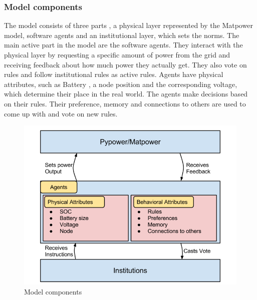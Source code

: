 \documentclass[a4paper]{article}
\begin{document}
\subsubsection{Model components}
The model consists of three parts , a physical layer represented by the Matpower model, software agents and an institutional 
layer, which sets the norms. 
The main active part in the model are the software agents. They interact with the physical layer by requesting a 
specific amount of power from the grid and receiving feedback about how much power they actually get. They also vote on rules 
and follow institutional rules as active rules. 
Agents have physical attributes, such as Battery , a node position and the corresponding voltage,  which determine their 
place in the real world. The agents make decisions based on their rules. Their preference, memory and connections to others 
are used to come up with and vote on new rules.
\begin{figure}[!ht]
\includegraphics[width =\textwidth]{concept_components.png}
\caption{Model components}
\label{mcomponents}
\end{figure}
\end{document}
